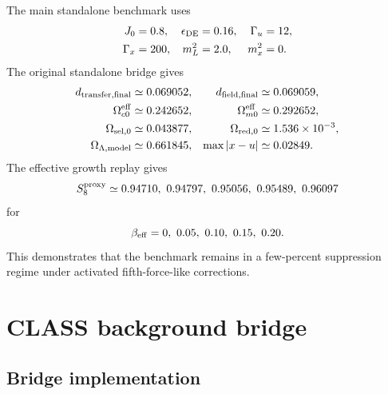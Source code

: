 ﻿\documentclass[11pt,prd,preprint,nofootinbib,amsmath,amssymb]{revtex4-2}
\begin{document}
The main standalone benchmark uses
\begin{align}
J_0&=0.8,
&
\epsilon_{\rm DE}&=0.16,
&
\Gamma_u&=12,
\nonumber\\
\Gamma_x&=200,
&
m_L^2&=2.0,
&
m_x^2&=0.
\end{align}
The original standalone bridge gives
\begin{align}
d_{\rm transfer,final}&\simeq0.069052,
&
d_{\rm field,final}&\simeq0.069059,
\\
\Omega_{c0}^{\rm eff}&\simeq0.242652,
&
\Omega_{m0}^{\rm eff}&\simeq0.292652,
\\
\Omega_{\rm sel,0}&\simeq0.043877,
&
\Omega_{\rm red,0}&\simeq1.536\times10^{-3},
\\
\Omega_{\Lambda,{\rm model}}&\simeq0.661845,
&
\max|x-u|&\simeq0.02849.
\end{align}
The effective growth replay gives
\begin{equation}
S_8^{\rm proxy}
\simeq
0.94710,\ 0.94797,\ 0.95056,\ 0.95489,\ 0.96097
\end{equation}
for
\begin{equation}
\beta_{\rm eff}=0,\ 0.05,\ 0.10,\ 0.15,\ 0.20.
\end{equation}
This demonstrates that the benchmark remains in a few-percent suppression regime under activated fifth-force-like corrections.

\section{CLASS background bridge}
\label{sec:class_background}

\subsection{Bridge implementation}
\end{document}
